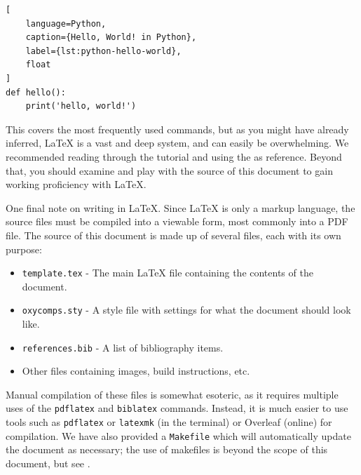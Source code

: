 \documentclass[10pt,twocolumn]{article}
\begin{document}
\begin{lstlisting}[
    language=Python,
    caption={Hello, World! in Python},
    label={lst:python-hello-world},
    float
]
def hello():
    print('hello, world!')
\end{lstlisting}

This covers the most frequently used commands, but as you might have already inferred, LaTeX is a vast and deep system, and can easily be overwhelming.
We recommended reading through the  tutorial \cite{Overleaf2021LearnLaTeXIn} and using the  \cite{WikiBook2022LaTeX} as reference.
Beyond that, you should examine and play with the source of this document to gain working proficiency with LaTeX.

One final note on writing in LaTeX.
Since LaTeX is only a markup language, the source files must be compiled into a viewable form, most commonly into a PDF file.
The source of this document is made up of several files, each with its own purpose:
\begin{itemize}
    \item \texttt{template.tex} - The main LaTeX file containing the contents of the document.
    \item \texttt{oxycomps.sty} - A style file with settings for what the document should look like.
    \item \texttt{references.bib} - A list of bibliography items.
    \item Other files containing images, build instructions, etc.
\end{itemize}
Manual compilation of these files is somewhat esoteric, as it requires multiple uses of the \texttt{pdflatex} and \texttt{biblatex} commands.
Instead, it is much easier to use tools such as \texttt{pdflatex} or \texttt{latexmk} (in the terminal) or Overleaf (online) for compilation.
We have also provided a \texttt{Makefile} which will automatically update the document as necessary; the use of makefiles is beyond the scope of this document, but see \textcite{Lambert2021MakefileTutorial}.
\end{document}
